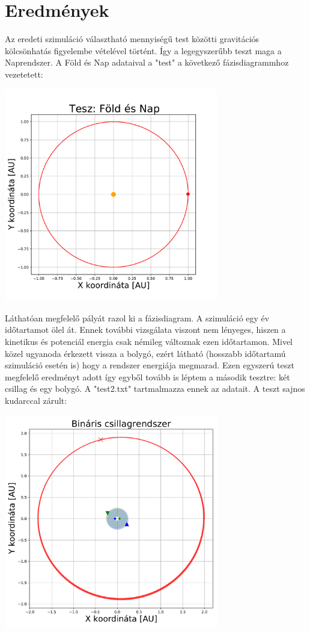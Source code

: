 \section{Eredmények}
Az eredeti szimuláció választható mennyiségű test közötti gravitációs kölcsönhatás figyelembe vételével történt. Így a legegyszerűbb teszt maga a Naprendszer. A Föld és Nap adataival a "test" a következő fázisdiagrammhoz vezetetett:
\begin{center}
    \includegraphics[width=0.7\textwidth]{pics/test1.pdf}
\end{center}
Láthatóan megfelelő pályát razol ki a fázisdiagram. A szimuláció egy év időtartamot ölel át. Ennek további vizsgálata viszont nem lényeges, hiszen a kinetikus és potenciál energia csak némileg változnak ezen időtartamon. Mivel közel ugyanoda érkezett vissza a bolygó, ezért látható (hosszabb időtartamú szimuláció esetén is) hogy a rendszer energiája megmarad.
Ezen egyszerú teszt megfelelő eredményt adott így egyből tovább is léptem a második tesztre: két csillag és egy bolygó. A "test2.txt" tartmalmazza ennek az adatait. A teszt sajnos kudarccal zárult:
\begin{center}
    \includegraphics[width=0.7\textwidth]{pics/test2.pdf}
    \label{wrong_result}
\end{center}
